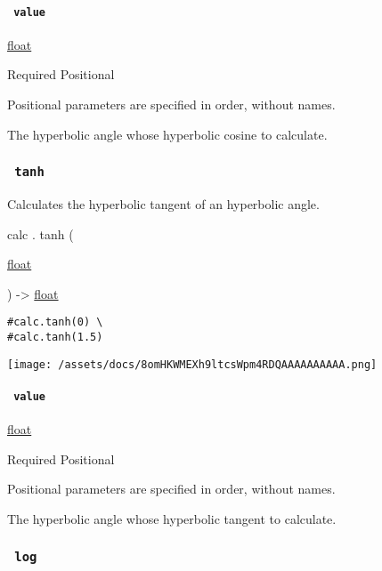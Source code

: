 \paragraph{\texorpdfstring{\texttt{\ value\ }}{ value }}\label{functions-cosh-value}

\href{/docs/reference/foundations/float/}{float}

{Required} {{ Positional }}

\label{functions-cosh-value-positional-tooltip}
Positional parameters are specified in order, without names.

The hyperbolic angle whose hyperbolic cosine to calculate.

\subsubsection{\texorpdfstring{\texttt{\ tanh\ }}{ tanh }}\label{functions-tanh}

Calculates the hyperbolic tangent of an hyperbolic angle.

calc { . } { tanh } (

{ \href{/docs/reference/foundations/float/}{float} }

) -\textgreater{} \href{/docs/reference/foundations/float/}{float}

\begin{verbatim}
#calc.tanh(0) \
#calc.tanh(1.5)
\end{verbatim}

\texttt{[image: /assets/docs/8omHKWMEXh9ltcsWpm4RDQAAAAAAAAAA.png]}

\paragraph{\texorpdfstring{\texttt{\ value\ }}{ value }}\label{functions-tanh-value}

\href{/docs/reference/foundations/float/}{float}

{Required} {{ Positional }}

\label{functions-tanh-value-positional-tooltip}
Positional parameters are specified in order, without names.

The hyperbolic angle whose hyperbolic tangent to calculate.

\subsubsection{\texorpdfstring{\texttt{\ log\ }}{ log }}\label{functions-log}

